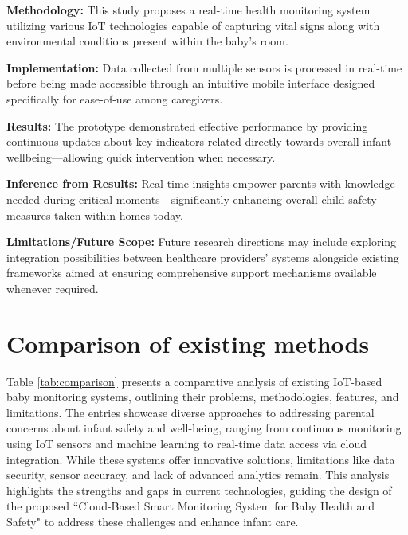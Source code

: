 \documentclass[12pt,a4paper]{report}
\begin{document}
\setlength{\parskip}{1em}  %


\noindent\textbf{Methodology:} This study proposes a real-time health monitoring system utilizing various IoT technologies capable of capturing vital signs along with environmental conditions present within the baby's room.

\setlength{\parskip}{1em}  %


\noindent\textbf{Implementation:} Data collected from multiple sensors is processed in real-time before being made accessible through an intuitive mobile interface designed specifically for ease-of-use among caregivers.
\setlength{\parskip}{1em}  %

\noindent\textbf{Results:} The prototype demonstrated effective performance by providing continuous updates about key indicators related directly towards overall infant wellbeing—allowing quick intervention when necessary.

\setlength{\parskip}{1em}  %


\noindent\textbf{Inference from Results:} Real-time insights empower parents with knowledge needed during critical moments—significantly enhancing overall child safety measures taken within homes today.


\setlength{\parskip}{1em}  %

\noindent\textbf{Limitations/Future Scope:} Future research directions may include exploring integration possibilities between healthcare providers’ systems alongside existing frameworks aimed at ensuring comprehensive support mechanisms available whenever required.
\setlength{\parskip}{1em}  %

\section{Comparison of existing methods}
Table \ref{tab:comparison} presents a comparative analysis of existing IoT-based baby monitoring systems, outlining their problems, methodologies, features, and limitations. The entries showcase diverse approaches to addressing parental concerns about infant safety and well-being, ranging from continuous monitoring using IoT sensors and machine learning to real-time data access via cloud integration. While these systems offer innovative solutions, limitations like data security, sensor accuracy, and lack of advanced analytics remain. This analysis highlights the strengths and gaps in current technologies, guiding the design of the proposed ``Cloud-Based Smart Monitoring System for Baby Health and Safety" to address these challenges and enhance infant care.
\end{document}
